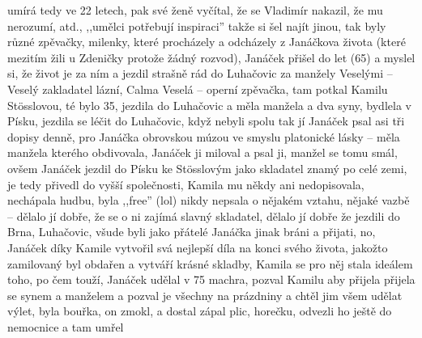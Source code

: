 \documentclass{article}
\begin{document}
\begin{itemize}
umírá tedy ve 22 letech, pak své ženě vyčítal, že se Vladimír nakazil, že mu nerozumí, atd., ,,umělci potřebují inspiraci” takže si šel najít jinou, tak byly různé zpěvačky, milenky, které procházely a odcházely z Janáčkova života (které mezitím žili u Zdeničky protože žádný rozvod), Janáček přišel do let (65) a myslel si, že život je za ním a jezdil strašně rád do Luhačovic za manžely Veselými -- Veselý zakladatel lázní, Calma Veselá -- operní zpěvačka, tam potkal Kamilu Stösslovou, té bylo 35, jezdila do Luhačovic a měla manžela a dva syny, bydlela v Písku, jezdila se léčit do Luhačovic, když nebyli spolu tak jí Janáček psal asi tři dopisy denně, pro Janáčka obrovskou múzou ve smyslu platonické lásky -- měla manžela kterého obdivovala, Janáček ji miloval a psal ji, manžel se tomu smál, ovšem Janáček jezdil do Písku ke Stösslovým jako skladatel znamý po celé zemi, je tedy přivedl do vyšší společnosti, Kamila mu někdy ani nedopisovala, nechápala hudbu, byla ,,free” (lol) nikdy nepsala o nějakém vztahu, nějaké vazbě -- dělalo jí dobře, že se o ni zajímá slavný skladatel, dělalo jí dobře že jezdili do Brna, Luhačovic, všude byli jako přátelé Janáčka jinak bráni a přijati, no, Janáček díky Kamile vytvořil svá nejlepší díla na konci svého života, jakožto zamilovaný byl obdařen a vytváří krásné skladby, Kamila se pro něj stala ideálem toho, po čem touží, Janáček udělal v 75 machra, pozval Kamilu aby přijela přijela se synem a manželem a pozval je všechny na prázdniny a chtěl jim všem udělat výlet, byla bouřka, on zmokl, a dostal zápal plic, horečku, odvezli ho ještě do nemocnice a tam umřel
\end{itemize}
\end{document}
